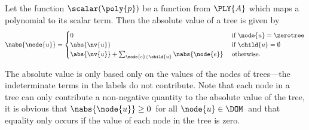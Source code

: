 \begin{definition}\label{absolute-value}
  Let the function $\scalar(\poly{p})$ be a function from $\PLY{A}$ which
  maps a polynomial to its scalar term. Then the absolute value of
  a tree is given by
  \begin{align*}
    \nabs{\node{u}} = \begin{cases}
      0 & \text{ if } \node{u} = \zerotree \\
      \abs{\nv{u}} & \text{ if }\child{u} = \emptyset \\
      \abs{\nv{u}} + \sum_{\node{e}\in\child{u}}\nabs{\node{e}} & \text{ otherwise.}
    \end{cases}
  \end{align*}
\end{definition}
The absolute value is only based only on the values of the
nodes of trees---the indeterminate terms in the labels do not contribute.                                                                           %
Note that each node in a tree can only contribute a non-negative
quantity to the absolute value of the tree, it is obvious that
$\nabs{\node{u}} \geq 0$\ for all $\node{u} \in \DOM$\ and that
equality only occurs if the value of each node in the tree 
is zero.


